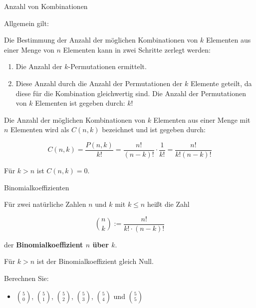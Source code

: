 \documentclass[12pt,ngerman,a4paper,ignorenonframetext,]{beamer}
\providecommand{\tightlist}{%
  \setlength{\itemsep}{0pt}\setlength{\parskip}{0pt}}
\begin{document}
\begin{frame}{Anzahl von Kombinationen}
\protect\hypertarget{anzahl-von-kombinationen-1}{}

Allgemein gilt:

Die Bestimmung der Anzahl der möglichen Kombinationen von \(k\)
Elementen aus einer Menge von \(n\) Elementen kann in zwei Schritte
zerlegt werden:

\begin{enumerate}
\tightlist
\item
  Die Anzahl der \(k\)-Permutationen ermittelt.
\item
  Diese Anzahl durch die Anzahl der Permutationen der \(k\) Elemente
  geteilt, da diese für die Kombination gleichwertig sind. Die Anzahl
  der Permutationen von \(k\) Elementen ist gegeben durch: \(k!\)
\end{enumerate}


\begin{Satz}

Die Anzahl der möglichen Kombinationen von \(k\) Elementen aus einer
Menge mit \(n\) Elementen wird als \(C(n,k)\) bezeichnet und ist gegeben
durch:

\begin{equation*} 
    C(n,k) = \frac{P(n,k)}{k!} = \frac{n!}{(n-k)!} \cdot \frac{1}{k!} = \frac{n!}{k!(n-k)!} 
\end{equation*}

Für \(k>n\) ist \(C(n,k) = 0\).

\end{Satz}

\end{frame}

\begin{frame}{Binomialkoeffizienten}
\protect\hypertarget{binomialkoeffizienten}{}


\begin{definition}[Binomialkoeffizienten]

Für zwei natürliche Zahlen \(n\) und \(k\) mit \(k \leq n\) heißt die
Zahl

\begin{equation*}
    \binom{n}{k} := \frac{n!}{k! \cdot (n-k)!}
\end{equation*}

der \textbf{Binomialkoeffizient $n$ über $k$}.

Für \(k>n\) ist der Binomialkoeffizient gleich Null.

\end{definition}


\begin{Beispiel}[Binomialkoeffizienten]

Berechnen Sie:

\begin{itemize}
\tightlist
\item
  \(\binom{5}{0}\), \(\binom{5}{1}\), \(\binom{5}{2}\),
  \(\binom{5}{3}\), \(\binom{5}{4}\) und \(\binom{5}{5}\)
\end{itemize}

\end{Beispiel}

\end{frame}
\end{document}
